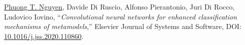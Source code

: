 \documentclass[a4paper,8pt]{article} %
\begin{document}
\begin{thebibliography}{100}
%	
%	
	\underline{Phuong T. Nguyen}, Davide Di Ruscio, Alfonso Pierantonio, Juri Di Rocco, Ludovico Iovino, ``\emph{Convolutional neural networks for enhanced classification mechanisms of metamodels},'' Elsevier Journal of Systems and Software, DOI: \href{https://doi.org/10.1016/j.jss.2020.110860}{10.1016/j.jss.2020.110860}.		
	
	
	



\end{thebibliography}
\end{document}
